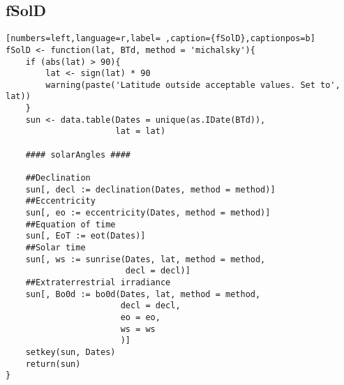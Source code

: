 \subsection{fSolD}
\label{sec:orgeffcda0}
\begin{lstlisting}[numbers=left,language=r,label= ,caption={fSolD},captionpos=b]
fSolD <- function(lat, BTd, method = 'michalsky'){
    if (abs(lat) > 90){
        lat <- sign(lat) * 90
        warning(paste('Latitude outside acceptable values. Set to', lat))
    }
    sun <- data.table(Dates = unique(as.IDate(BTd)),
                      lat = lat)

    #### solarAngles ####

    ##Declination
    sun[, decl := declination(Dates, method = method)]
    ##Eccentricity
    sun[, eo := eccentricity(Dates, method = method)]
    ##Equation of time
    sun[, EoT := eot(Dates)]
    ##Solar time
    sun[, ws := sunrise(Dates, lat, method = method,
                        decl = decl)]
    ##Extraterrestrial irradiance
    sun[, Bo0d := bo0d(Dates, lat, method = method,
                       decl = decl,
                       eo = eo,
                       ws = ws
                       )]
    setkey(sun, Dates)
    return(sun)
}
\end{lstlisting}
